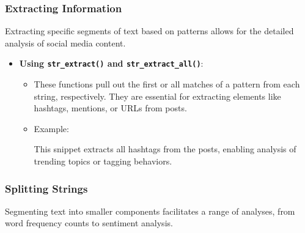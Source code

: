\documentclass[
]{book}
\newenvironment{Shaded}{\begin{snugshade}}{\end{snugshade}}
\newcommand{\FunctionTok}[1]{\textcolor[rgb]{0.13,0.29,0.53}{\textbf{#1}}}
\newcommand{\NormalTok}[1]{#1}
\newcommand{\OtherTok}[1]{\textcolor[rgb]{0.56,0.35,0.01}{#1}}
\newcommand{\SpecialCharTok}[1]{\textcolor[rgb]{0.81,0.36,0.00}{\textbf{#1}}}
\newcommand{\StringTok}[1]{\textcolor[rgb]{0.31,0.60,0.02}{#1}}
\providecommand{\tightlist}{%
  \setlength{\itemsep}{0pt}\setlength{\parskip}{0pt}}
\begin{document}
\hypertarget{extracting-information}{%
\subsubsection{Extracting Information}\label{extracting-information}}

Extracting specific segments of text based on patterns allows for the detailed analysis of social media content.

\begin{itemize}
\tightlist
\item
  \textbf{Using \texttt{str\_extract()} and \texttt{str\_extract\_all()}}:

  \begin{itemize}
  \item
    These functions pull out the first or all matches of a pattern from each string, respectively. They are essential for extracting elements like hashtags, mentions, or URLs from posts.
  \item
    Example:

\begin{Shaded}
\end{Shaded}

    This snippet extracts all hashtags from the posts, enabling analysis of trending topics or tagging behaviors.
  \end{itemize}
\end{itemize}

\hypertarget{splitting-strings}{%
\subsubsection{Splitting Strings}\label{splitting-strings}}

Segmenting text into smaller components facilitates a range of analyses, from word frequency counts to sentiment analysis.
\end{document}
